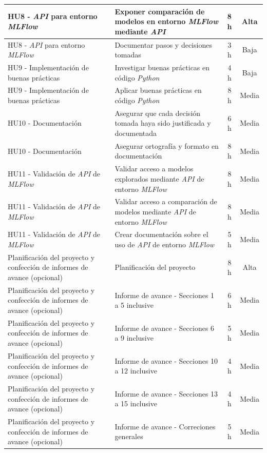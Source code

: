 \documentclass[
11pt, %
]{charter}
\begin{document}
\begin{xltabular}{\linewidth}{@{}|X|X|c|c|@{}}
HU8 - \textit{API} para entorno \textit{MLFlow} & Exponer comparación de modelos en entorno \textit{MLFlow} mediante \textit{API} & 8 h & Alta \\ \hline
HU8 - \textit{API} para entorno \textit{MLFlow} & Documentar pasos y decisiones tomadas & 3 h & Baja \\ \hline
HU9 - Implementación de buenas prácticas & Investigar buenas prácticas en código \textit{Python} & 4 h & Baja \\ \hline
HU9 - Implementación de buenas prácticas & Aplicar buenas prácticas en código \textit{Python} & 8 h & Media \\ \hline
HU10 - Documentación & Asegurar que cada decisión tomada haya sido justificada y documentada & 6 h & Media \\ \hline
HU10 - Documentación & Asegurar ortografía y formato en documentación & 8 h & Media \\ \hline
HU11 - Validación de \textit{API} de \textit{MLFlow} & Validar acceso a modelos explorados mediante \textit{API} de entorno \textit{MLFlow} & 8 h & Media \\ \hline
HU11 - Validación de \textit{API} de \textit{MLFlow} & Validar acceso a comparación de modelos mediante \textit{API} de entorno \textit{MLFlow} & 8 h & Media \\ \hline
HU11 - Validación de \textit{API} de \textit{MLFlow} & Crear documentación sobre el uso de \textit{API} de entorno \textit{MLFlow} & 5 h & Media \\ \hline
Planificación del proyecto y confección de informes de avance (opcional) & Planificación del proyecto & 8 h & Alta \\ \hline
Planificación del proyecto y confección de informes de avance (opcional) & Informe de avance - Secciones 1 a 5 inclusive & 6 h & Media \\ \hline
Planificación del proyecto y confección de informes de avance (opcional) & Informe de avance - Secciones 6 a 9 inclusive & 5 h & Media \\ \hline
Planificación del proyecto y confección de informes de avance (opcional) & Informe de avance - Secciones 10 a 12 inclusive & 4 h & Media \\ \hline
Planificación del proyecto y confección de informes de avance (opcional) & Informe de avance - Secciones 13 a 15 inclusive & 4 h & Media \\ \hline
Planificación del proyecto y confección de informes de avance (opcional) & Informe de avance - Correciones generales & 5 h & Media \\ \hline

\end{xltabular}
\end{document}
